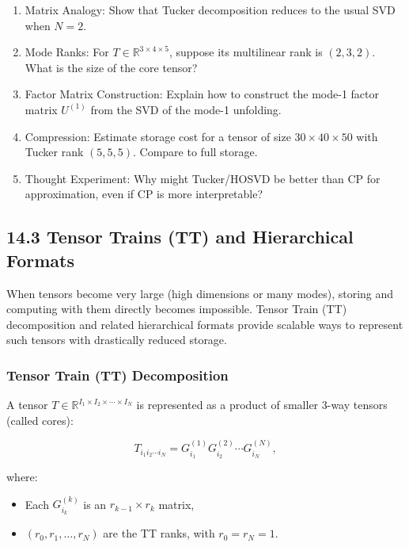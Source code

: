 \documentclass[
  letterpaper,
  DIV=11,
  numbers=noendperiod]{scrreprt}
\providecommand{\tightlist}{%
  \setlength{\itemsep}{0pt}\setlength{\parskip}{0pt}}
\begin{document}
\begin{enumerate}
\def\labelenumi{\arabic{enumi}.}
\item
  Matrix Analogy: Show that Tucker decomposition reduces to the usual
  SVD when \(N=2\).
\item
  Mode Ranks: For \(T \in \mathbb{R}^{3 \times 4 \times 5}\), suppose
  its multilinear rank is \((2,3,2)\). What is the size of the core
  tensor?
\item
  Factor Matrix Construction: Explain how to construct the mode-1 factor
  matrix \(U^{(1)}\) from the SVD of the mode-1 unfolding.
\item
  Compression: Estimate storage cost for a tensor of size
  \(30 \times 40 \times 50\) with Tucker rank \((5,5,5)\). Compare to
  full storage.
\item
  Thought Experiment: Why might Tucker/HOSVD be better than CP for
  approximation, even if CP is more interpretable?
\end{enumerate}

\subsection{14.3 Tensor Trains (TT) and Hierarchical
Formats}\label{tensor-trains-tt-and-hierarchical-formats}

When tensors become very large (high dimensions or many modes), storing
and computing with them directly becomes impossible. Tensor Train (TT)
decomposition and related hierarchical formats provide scalable ways to
represent such tensors with drastically reduced storage.

\subsubsection{Tensor Train (TT)
Decomposition}\label{tensor-train-tt-decomposition}

A tensor \(T \in \mathbb{R}^{I_1 \times I_2 \times \cdots \times I_N}\)
is represented as a product of smaller 3-way tensors (called cores):

\[
T_{i_1 i_2 \cdots i_N} = G^{(1)}_{i_1} G^{(2)}_{i_2} \cdots G^{(N)}_{i_N},
\]

where:

\begin{itemize}
\tightlist
\item
  Each \(G^{(k)}_{i_k}\) is an \(r_{k-1} \times r_k\) matrix,
\item
  \((r_0, r_1, \dots, r_N)\) are the TT ranks, with \(r_0 = r_N = 1\).
\end{itemize}
\end{document}
